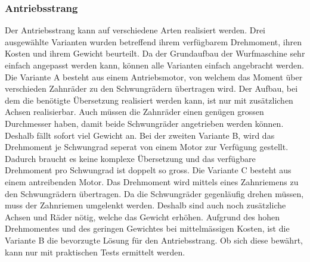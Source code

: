 \subsubsection{Antriebsstrang}
Der Antriebsstrang kann auf verschiedene Arten realisiert werden. Drei ausgewählte Varianten wurden betreffend ihrem verfügbarem Drehmoment, ihren Kosten und ihrem Gewicht beurteilt. Da der Grundaufbau der Wurfmaschine sehr einfach angepasst werden kann, können alle Varianten einfach angebracht werden. Die Variante A besteht aus einem Antriebsmotor, von welchem das Moment über verschieden Zahnräder zu den Schwungrädern übertragen wird. Der Aufbau, bei dem die benötigte Übersetzung realisiert werden kann, ist nur mit zusätzlichen Achsen realisierbar. Auch müssen die Zahnräder einen genügen grossen Durchmesser haben, damit beide Schwungräder angetrieben werden können. Deshalb fällt sofort viel Gewicht an. Bei der zweiten Variante B, wird das Drehmoment je Schwungrad seperat von einem Motor zur Verfügung gestellt. Dadurch braucht es keine komplexe Übersetzung und das verfügbare Drehmoment pro Schwungrad ist doppelt so gross. Die Variante C besteht aus einem antreibenden Motor. Das Drehmoment wird mittels eines Zahnriemens zu den Schwungrädern übertragen. Da die Schwungräder gegenläufig drehen müssen, muss der Zahnriemen umgelenkt werden. Deshalb sind auch noch zusätzliche Achsen und Räder nötig, welche das Gewicht erhöhen. Aufgrund des hohen Drehmomentes und des geringen Gewichtes bei mittelmässigen Kosten, ist die Variante B die bevorzugte Lösung für den Antriebsstrang. Ob sich diese bewährt, kann nur mit praktischen Tests ermittelt werden.

